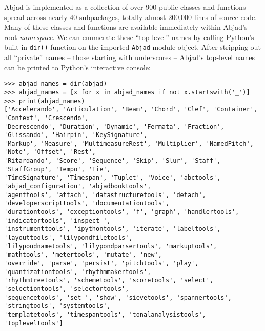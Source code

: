 \noindent Abjad is implemented as a collection of over 900 public classes and
functions spread across nearly 40 subpackages, totally almost 200,000 lines of
source code. Many of these classes and functions are available immediately
within Abjad's root \emph{namespace}. We can enumerate these
\enquote{top-level} names by calling Python's built-in \texttt{dir()} function
on the imported \texttt{Abjad} module object. After stripping out all
\enquote{private} names -- those starting with underscores -- Abjad's top-level
names can be printed to Python's interactive console:

\begin{comment}
<abjad>[text_width=105]
abjad_names = dir(abjad)
abjad_names = [x for x in abjad_names if not x.startswith('_')]
print(abjad_names)
</abjad>
\end{comment}

\begin{abjadbookoutput}
\begin{singlespacing}
\vspace{-0.5\baselineskip}
\begin{lstlisting}
>>> abjad_names = dir(abjad)
>>> abjad_names = [x for x in abjad_names if not x.startswith('_')]
>>> print(abjad_names)
['Accelerando', 'Articulation', 'Beam', 'Chord', 'Clef', 'Container', 'Context', 'Crescendo',
'Decrescendo', 'Duration', 'Dynamic', 'Fermata', 'Fraction', 'Glissando', 'Hairpin', 'KeySignature',
'Markup', 'Measure', 'MultimeasureRest', 'Multiplier', 'NamedPitch', 'Note', 'Offset', 'Rest',
'Ritardando', 'Score', 'Sequence', 'Skip', 'Slur', 'Staff', 'StaffGroup', 'Tempo', 'Tie',
'TimeSignature', 'Timespan', 'Tuplet', 'Voice', 'abctools', 'abjad_configuration', 'abjadbooktools',
'agenttools', 'attach', 'datastructuretools', 'detach', 'developerscripttools', 'documentationtools',
'durationtools', 'exceptiontools', 'f', 'graph', 'handlertools', 'indicatortools', 'inspect_',
'instrumenttools', 'ipythontools', 'iterate', 'labeltools', 'layouttools', 'lilypondfiletools',
'lilypondnametools', 'lilypondparsertools', 'markuptools', 'mathtools', 'metertools', 'mutate', 'new',
'override', 'parse', 'persist', 'pitchtools', 'play', 'quantizationtools', 'rhythmmakertools',
'rhythmtreetools', 'schemetools', 'scoretools', 'select', 'selectiontools', 'selectortools',
'sequencetools', 'set_', 'show', 'sievetools', 'spannertools', 'stringtools', 'systemtools',
'templatetools', 'timespantools', 'tonalanalysistools', 'topleveltools']
\end{lstlisting}
\end{singlespacing}
\end{abjadbookoutput}

